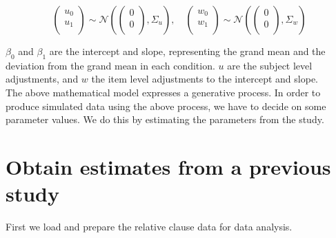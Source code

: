 \documentclass[12pt,]{krantz}
\newenvironment{Shaded}{\begin{snugshade}}{\end{snugshade}}
\newcommand{\DataTypeTok}[1]{\textcolor[rgb]{0.13,0.29,0.53}{#1}}
\newcommand{\DecValTok}[1]{\textcolor[rgb]{0.00,0.00,0.81}{#1}}
\newcommand{\KeywordTok}[1]{\textcolor[rgb]{0.13,0.29,0.53}{\textbf{#1}}}
\newcommand{\NormalTok}[1]{#1}
\newcommand{\OperatorTok}[1]{\textcolor[rgb]{0.81,0.36,0.00}{\textbf{#1}}}
\newcommand{\OtherTok}[1]{\textcolor[rgb]{0.56,0.35,0.01}{#1}}
\newcommand{\StringTok}[1]{\textcolor[rgb]{0.31,0.60,0.02}{#1}}
\begin{document}
\begin{equation}\label{eq:jointpriordistsimulation}
\begin{pmatrix}
  u_0 \\ 
  u_1 \\
\end{pmatrix}
\sim 
\mathcal{N} \left(
\begin{pmatrix}
  0 \\
  0 \\
\end{pmatrix},
\Sigma_{u}
\right),
\quad
\begin{pmatrix}
  w_0 \\ 
  w_1 \\
\end{pmatrix}
\sim 
\mathcal{N}\left(
\begin{pmatrix}
  0 \\
  0 \\
\end{pmatrix},
\Sigma_{w}
\right)
\end{equation}

\(\beta_0\) and \(\beta_1\) are the intercept and slope, representing the grand mean and the deviation from the grand mean in each condition. \(u\) are the subject level adjustments, and \(w\) the item level adjustments to the intercept and slope.\\
The above mathematical model expresses a generative process. In order to produce simulated data using the above process, we have to decide on some parameter values. We do this by estimating the parameters from the \citet{grodner} study.

\hypertarget{obtain-estimates-from-a-previous-study}{%
\section{Obtain estimates from a previous study}\label{obtain-estimates-from-a-previous-study}}

First we load and prepare the relative clause data for data analysis.

\begin{Shaded}
\end{Shaded}
\end{document}

